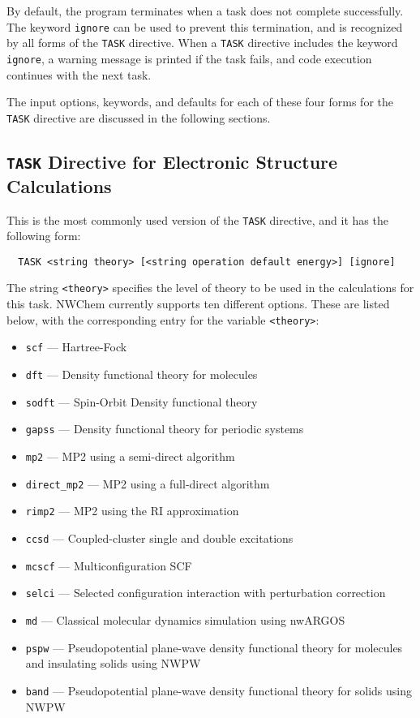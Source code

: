 By default, the program terminates when a task does not complete
successfully.  The keyword \verb+ignore+ can be used to prevent this
termination, and is recognized by all forms of the \verb+TASK+
directive.  When a \verb+TASK+ directive includes the keyword
\verb+ignore+, a warning message is printed if the task fails, and
code execution continues with the next task.

The input options, keywords, and defaults for each of these four forms
for the \verb+TASK+ directive are discussed in the following sections.

\subsection{{\tt TASK} Directive for Electronic Structure Calculations}
\label{sec:first_task}

This is the most commonly used version of the \verb+TASK+ directive, and
it has the following form:

\begin{verbatim}
  TASK <string theory> [<string operation default energy>] [ignore]
\end{verbatim}

The string \verb+<theory>+ specifies the level of theory to be used in the
calculations for this task.  NWChem currently supports ten different
options.  These are listed below, with the corresponding entry for 
the variable {\tt <theory>}:
\begin{itemize}
 \item \verb+scf+ --- Hartree-Fock
 \item \verb+dft+ --- Density functional theory for molecules
 \item \verb+sodft+ --- Spin-Orbit Density functional theory
 \item \verb+gapss+ --- Density functional theory for periodic systems
 \item \verb+mp2+ --- MP2 using a semi-direct algorithm
 \item \verb+direct_mp2+ --- MP2 using a full-direct algorithm
 \item \verb+rimp2+ --- MP2 using the RI approximation
 \item \verb+ccsd+ --- Coupled-cluster single and double excitations
 \item \verb+mcscf+ --- Multiconfiguration SCF
 \item \verb+selci+ --- Selected configuration interaction with perturbation
   correction 
 \item \verb+md+ --- Classical molecular dynamics simulation using nwARGOS
 \item \verb+pspw+ --- Pseudopotential plane-wave density functional theory for molecules and insulating solids using NWPW
 \item \verb+band+ --- Pseudopotential plane-wave density functional theory for solids using NWPW
\end{itemize}

